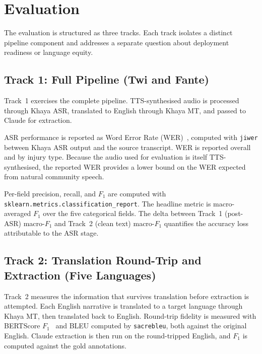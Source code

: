 \documentclass[conference]{IEEEtran}
\begin{document}
\section{Evaluation}
\label{sec:eval}

The evaluation is structured as three tracks. Each track isolates a
distinct pipeline component and addresses a separate question about
deployment readiness or language equity.

\subsection{Track 1: Full Pipeline (Twi and Fante)}

Track~1 exercises the complete pipeline. TTS-synthesised audio is
processed through Khaya ASR, translated to English through Khaya MT,
and passed to Claude for extraction.

ASR performance is reported as Word Error Rate
(WER)~\cite{morris2004}, computed with \texttt{jiwer} between Khaya
ASR output and the source transcript. WER is reported overall and by
injury type. Because the audio used for evaluation is itself
TTS-synthesised, the reported WER provides a lower bound on the WER
expected from natural community speech.

Per-field precision, recall, and $F_{1}$ are computed with
\texttt{sklearn.metrics.classification\_report}. The headline metric
is macro-averaged $F_{1}$ over the five categorical fields. The
delta between Track~1 (post-ASR) macro-$F_{1}$ and Track~2 (clean
text) macro-$F_{1}$ quantifies the accuracy loss attributable to the
ASR stage.

\subsection{Track 2: Translation Round-Trip and Extraction (Five Languages)}

Track~2 measures the information that survives translation before
extraction is attempted. Each English narrative is translated to a
target language through Khaya MT, then translated back to English.
Round-trip fidelity is measured with BERTScore
$F_{1}$~\cite{zhang2019bertscore} and BLEU computed by
\texttt{sacrebleu}, both against the original English. Claude
extraction is then run on the round-tripped English, and $F_{1}$ is
computed against the gold annotations.
\end{document}
